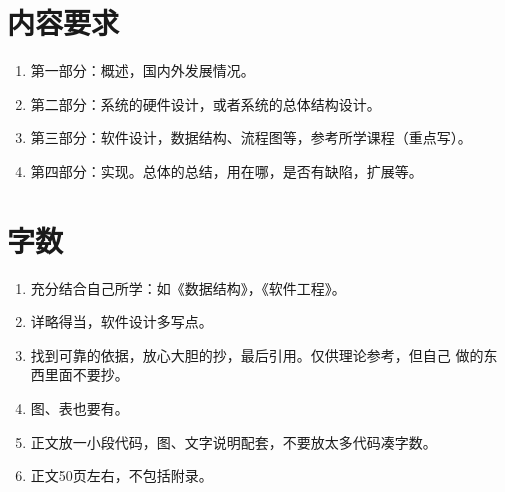 \documentclass[hazy, normal, blue, 14pt]{elegantnote}
\begin{document}
\section{内容要求}

\begin{enumerate}
    \item 第一部分：概述，国内外发展情况。
    \item 第二部分：系统的硬件设计，或者系统的总体结构设计。
    \item 第三部分：软件设计，数据结构、流程图等，参考所学课程（重点写）。
    \item 第四部分：实现。总体的总结，用在哪，是否有缺陷，扩展等。
\end{enumerate}

\section{字数}

\begin{enumerate}
    \item 充分结合自己所学：如《数据结构》，《软件工程》。
    \item 详略得当，软件设计多写点。
    \item 找到可靠的依据，放心大胆的抄，最后引用。仅供理论参考，但自己
    做的东西里面不要抄。
    \item 图、表也要有。
    \item 正文放一小段代码，图、文字说明配套，不要放太多代码凑字数。
    \item 正文50页左右，不包括附录。
\end{enumerate}
\end{document}
